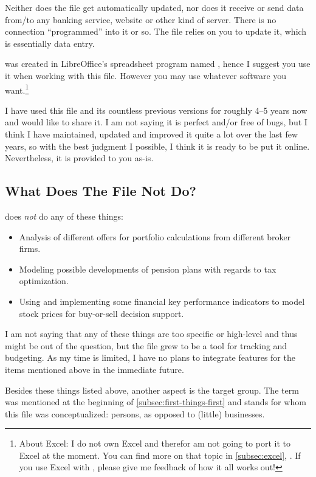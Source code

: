\begin{specialnote}
	Neither does the file get automatically updated, nor does it receive or send data from/to any banking service, website or other kind of server.
	There is no connection ``programmed'' into it or so.
	The file relies on you to update it, which is essentially data entry.	
\end{specialnote}

\tfn was created in LibreOffice's spreadsheet program named , hence I suggest you use it when working with this file.
However you may use whatever software you want.\footnote{About Excel: I do not own Excel and therefor am not going to port it to Excel at the moment.
You can find more on that topic in \autoref{subsec:excel}, .
If you use Excel with \tfn, please give me feedback of how it all works out!}

I have used this file and its countless previous versions for roughly 4--5 years now and would like to share it.
I am not saying it is perfect and/or free of bugs, but I think I have maintained, updated and improved it quite a lot over the last few years, so with the best judgment I possible, I think it is ready to be put it online.
Nevertheless, it is provided to you as-is.

\subsection{What Does The File Not Do?}
\label{subsec:not-included}

\tfn does \emph{not} do any of these things:
\begin{itemize}
	\item Analysis of different offers for portfolio calculations from different broker firms.
	\item Modeling possible developments of pension plans with regards to tax optimization.
	\item Using and implementing some financial key performance indicators to model stock prices for buy-or-sell decision support.
\end{itemize}
I am not saying that any of these things are too specific or high-level and thus might be out of the question, but the file grew to be a tool for tracking and budgeting.
As my time is limited, I have no plans to integrate features for the items mentioned above in the immediate future.

Besides these things listed above, another aspect is the target group.
The term  was mentioned at the beginning of \autoref{subsec:first-things-first} and stands for whom this file was conceptualized: persons, as opposed to (little) businesses.

